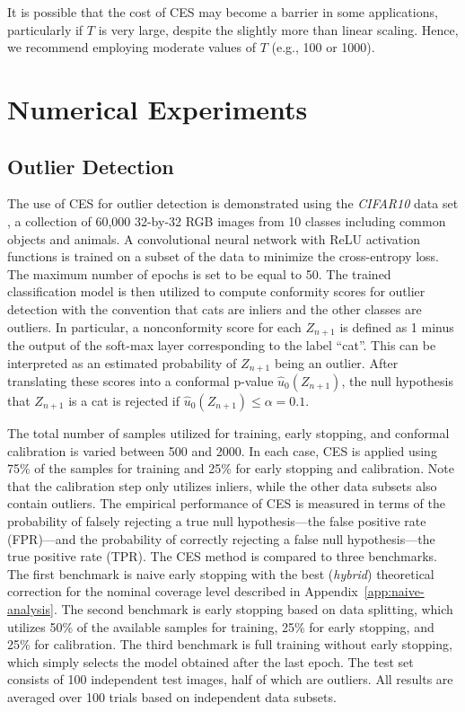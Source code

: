 It is possible that the cost of CES may become a barrier in some applications, particularly if $T$ is very large, despite the slightly more than linear scaling. Hence, we recommend employing moderate values of $T$ (e.g., 100 or 1000).

\section{Numerical Experiments} \label{sec:numerical_results}


\subsection{Outlier Detection} \label{sec:num_od}

The use of CES for outlier detection is demonstrated using the {\em CIFAR10} data set \citep{cifar10}, a collection of 60,000 32-by-32 RGB images from 10 classes including common objects and animals.
A convolutional neural network with ReLU activation functions is trained on a subset of the data to minimize the cross-entropy loss. The maximum number of epochs is set to be equal to 50.
The trained classification model is then utilized to compute conformity scores for outlier detection with the convention that cats are inliers and the other classes are outliers.
In particular, a nonconformity score for each $Z_{n+1}$ is defined as 1 minus the output of the soft-max layer corresponding to the label ``cat''.
This can be interpreted as an estimated probability of $Z_{n+1}$ being an outlier.
After translating these scores into a conformal p-value $\hat{u}_0(Z_{n+1})$, the null hypothesis that $Z_{n+1}$ is a cat is rejected if $\hat{u}_0(Z_{n+1}) \leq \alpha = 0.1$.

The total number of samples utilized for training, early stopping, and conformal calibration is varied between 500 and 2000.
In each case, CES is applied using 75\% of the samples for training and 25\% for early stopping and calibration. Note that the calibration step only utilizes inliers, while the other data subsets also contain outliers.
The empirical performance of CES is measured in terms of the probability of falsely rejecting a true null hypothesis---the false positive rate (FPR)---and the probability of correctly rejecting a false null hypothesis---the true positive rate (TPR).
The CES method is compared to three benchmarks. The first benchmark is naive early stopping with the best ({\em hybrid}) theoretical correction for the nominal coverage level described in Appendix~\ref{app:naive-analysis}. The second benchmark is early stopping based on data splitting, which utilizes 50\% of the available samples for training, 25\% for early stopping, and 25\% for calibration.
The third benchmark is full training without early stopping, which simply selects the model obtained after the last epoch.
The test set consists of 100 independent test images, half of which are outliers.
All results are averaged over 100 trials based on independent data subsets.

